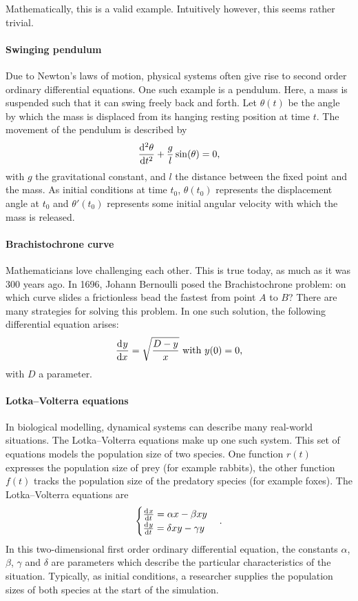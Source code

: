 Mathematically, this is a valid example. Intuitively however, this seems rather trivial.

\paragraph{Swinging pendulum} Due to Newton's laws of motion, physical systems often give rise to second order ordinary differential equations. One such example is a pendulum. Here, a mass is suspended such that it can swing freely back and forth. Let $\theta(t)$ be the angle by which the mass is displaced from its hanging resting position at time $t$. The movement of the pendulum is described by
$$
    \dv[2]{\theta}{t} + \frac{g}{l} \sin(\theta) = 0\text{,}
$$
with $g$ the gravitational constant, and $l$ the distance between the fixed point and the mass. As initial conditions at time $t_0$, $\theta(t_0)$ represents the displacement angle at $t_0$ and $\theta'(t_0)$ represents some initial angular velocity with which the mass is released.

\paragraph{Brachistochrone curve} Mathematicians love challenging each other. This is true today, as much as it was 300 years ago. In 1696, Johann Bernoulli posed the Brachistochrone problem: on which curve slides a frictionless bead the fastest from point $A$ to $B$? There are many strategies for solving this problem. In one such solution, the following differential equation arises:
$$
    {\dv[]{y}{x}} = \sqrt{\frac{D - y}{x}} \text{ with $y(0) = 0$,}
$$
with $D$ a parameter.

\paragraph{Lotka--Volterra equations} In biological modelling, dynamical systems can describe many real-world situations. The Lotka--Volterra equations make up one such system. This set of equations models the population size of two species. One function $r(t)$ expresses the population size of prey (for example rabbits), the other function $f(t)$ tracks the population size of the predatory species (for example foxes). The Lotka--Volterra equations are
$$
    \begin{cases}
        \dv[]{x}{t} = \alpha x - \beta x y  \\
        \dv[]{y}{t} = \delta x y - \gamma y \\
    \end{cases}\text{.}
$$
In this two-dimensional first order ordinary differential equation, the constants $\alpha$, $\beta$, $\gamma$ and $\delta$ are parameters which describe the particular characteristics of the situation. Typically, as initial conditions, a researcher supplies the population sizes of both species at the start of the simulation.

